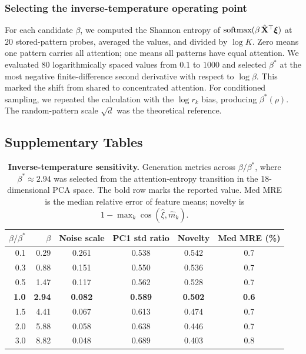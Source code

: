 \subsubsection*{Selecting the inverse-temperature operating point}

For each candidate $\beta$, we computed the Shannon entropy of
$\text{softmax}(\beta\,\hat{\mathbf{X}}^\top\boldsymbol{\xi})$ at $20$ stored-pattern probes, averaged the values,
and divided by $\log K$. Zero means one pattern carries all attention; one means all patterns
have equal attention. We evaluated $80$ logarithmically spaced values from $0.1$ to $1000$ and
selected $\beta^*$ at the most negative finite-difference second derivative with respect to
$\log\beta$. This marked the shift from shared to concentrated attention. For conditioned
sampling, we repeated the calculation with the $\log r_k$ bias, producing
$\beta^*(\rho)$. The random-pattern scale $\sqrt{d}$ was the theoretical reference.

\subsection*{Supplementary Tables}

\begin{table}[ht]
\centering
\caption{\textbf{Inverse-temperature sensitivity.} Generation metrics across
$\beta/\beta^*$, where $\beta^*\approx2.94$ was selected from the attention-entropy
transition in the 18-dimensional PCA space. The bold row marks the reported value.
Med MRE is the median relative error of feature means; novelty is
$1-\max_k\cos(\hat{\xi},\hat{m}_k)$.}
\label{stab:beta-sweep}
\begin{tabular}{rrcccc}
\toprule
$\beta/\beta^*$ & $\beta$ & Noise scale & PC1 std ratio & Novelty & Med MRE (\%) \\
\midrule
0.1 & 0.29 & 0.261 & 0.538 & 0.542 & 0.7 \\
0.3 & 0.88 & 0.151 & 0.550 & 0.536 & 0.7 \\
0.5 & 1.47 & 0.117 & 0.562 & 0.528 & 0.7 \\
\textbf{1.0} & \textbf{2.94} & \textbf{0.082} & \textbf{0.589} & \textbf{0.502} & \textbf{0.6} \\
1.5 & 4.41 & 0.067 & 0.613 & 0.474 & 0.7 \\
2.0 & 5.88 & 0.058 & 0.638 & 0.446 & 0.7 \\
3.0 & 8.82 & 0.048 & 0.689 & 0.403 & 0.8 \\
\bottomrule
\end{tabular}
\end{table}

